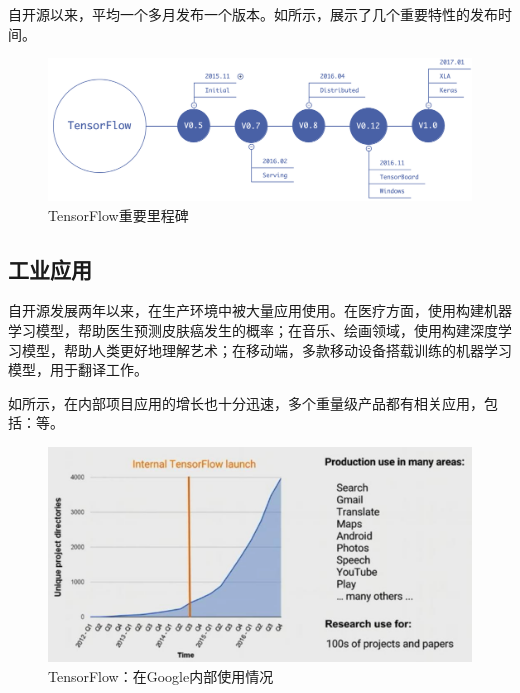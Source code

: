 \begin{content}
\tf{}自开源以来，平均一个多月发布一个版本。如所示，展示了\tf{}几个重要特性的发布时间。

\begin{figure}[!htbp]
\centering
\includegraphics[width=1.0\textwidth]{figures/tf-versions.png}
\caption{TensorFlow重要里程碑}
 \label{fig:tf-versions}
\end{figure}

\subsection{工业应用}

自开源发展两年以来，在生产环境中被大量应用使用。在医疗方面，使用构建机器学习模型，帮助医生预测皮肤癌发生的概率；在音乐、绘画领域，使用构建深度学习模型，帮助人类更好地理解艺术；在移动端，多款移动设备搭载训练的机器学习模型，用于翻译工作。

如所示，在内部项目应用的增长也十分迅速，多个重量级产品都有相关应用，包括：等。

\begin{figure}[!htbp]
\centering
\includegraphics[width=1.0\textwidth]{figures/tf-google-apps.png}
\caption{TensorFlow：在Google内部使用情况}
 \label{fig:tf-google-apps}
\end{figure}

\end{content}